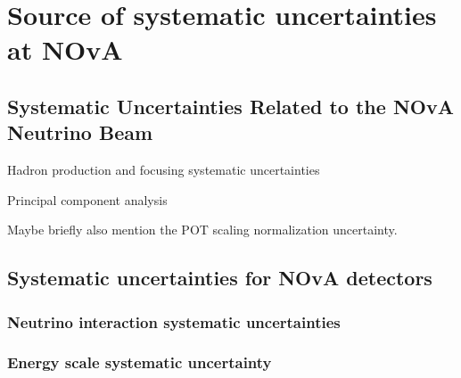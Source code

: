 
\section{Source of systematic uncertainties at NOvA}

\subsection{Systematic Uncertainties Related to the NOvA Neutrino Beam}

Hadron production and focusing systematic uncertainties

Principal component analysis

Maybe briefly also mention the POT scaling normalization uncertainty.

\subsection{Systematic uncertainties for NOvA detectors}

\subsubsection{Neutrino interaction systematic uncertainties}

\subsubsection{Energy scale systematic uncertainty}


